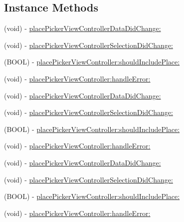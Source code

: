 \subsection*{Instance Methods}
\begin{DoxyCompactItemize}
\item 
(void) -\/ \hyperlink{protocolFBPlacePickerDelegate_01-p_aaa234bae2ec98cf414ef201da6264c67}{place\+Picker\+View\+Controller\+Data\+Did\+Change\+:}
\item 
(void) -\/ \hyperlink{protocolFBPlacePickerDelegate_01-p_a45f5c05ae6b3d030c4350562954964db}{place\+Picker\+View\+Controller\+Selection\+Did\+Change\+:}
\item 
(B\+O\+OL) -\/ \hyperlink{protocolFBPlacePickerDelegate_01-p_a619f252e10abcf1c95a99de98181bc41}{place\+Picker\+View\+Controller\+:should\+Include\+Place\+:}
\item 
(void) -\/ \hyperlink{protocolFBPlacePickerDelegate_01-p_a5a050442be2188ad3b2b04aa977577a4}{place\+Picker\+View\+Controller\+:handle\+Error\+:}
\item 
(void) -\/ \hyperlink{protocolFBPlacePickerDelegate_01-p_aaa234bae2ec98cf414ef201da6264c67}{place\+Picker\+View\+Controller\+Data\+Did\+Change\+:}
\item 
(void) -\/ \hyperlink{protocolFBPlacePickerDelegate_01-p_a45f5c05ae6b3d030c4350562954964db}{place\+Picker\+View\+Controller\+Selection\+Did\+Change\+:}
\item 
(B\+O\+OL) -\/ \hyperlink{protocolFBPlacePickerDelegate_01-p_a619f252e10abcf1c95a99de98181bc41}{place\+Picker\+View\+Controller\+:should\+Include\+Place\+:}
\item 
(void) -\/ \hyperlink{protocolFBPlacePickerDelegate_01-p_a5a050442be2188ad3b2b04aa977577a4}{place\+Picker\+View\+Controller\+:handle\+Error\+:}
\item 
(void) -\/ \hyperlink{protocolFBPlacePickerDelegate_01-p_aaa234bae2ec98cf414ef201da6264c67}{place\+Picker\+View\+Controller\+Data\+Did\+Change\+:}
\item 
(void) -\/ \hyperlink{protocolFBPlacePickerDelegate_01-p_a45f5c05ae6b3d030c4350562954964db}{place\+Picker\+View\+Controller\+Selection\+Did\+Change\+:}
\item 
(B\+O\+OL) -\/ \hyperlink{protocolFBPlacePickerDelegate_01-p_a619f252e10abcf1c95a99de98181bc41}{place\+Picker\+View\+Controller\+:should\+Include\+Place\+:}
\item 
(void) -\/ \hyperlink{protocolFBPlacePickerDelegate_01-p_a5a050442be2188ad3b2b04aa977577a4}{place\+Picker\+View\+Controller\+:handle\+Error\+:}

\end{DoxyCompactItemize}
